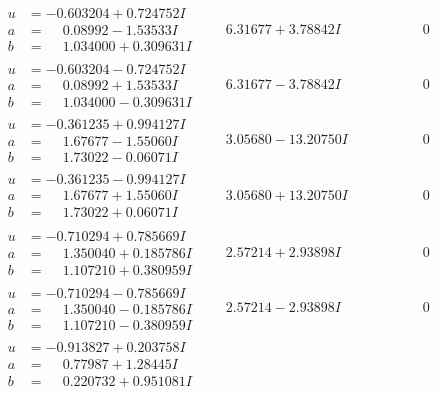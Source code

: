 \documentclass[1p]{elsarticle_modified}
\theoremstyle{definition}
\begin{document}
$$\begin{array}{c|c|c}
\begin{aligned}
u &= -0.603204 + 0.724752 I \\
a &= \phantom{-}0.08992 - 1.53533 I \\
b &= \phantom{-}1.034000 + 0.309631 I\end{aligned}
 & \phantom{-}6.31677 + 3.78842 I & \phantom{-0.000000 } 0 \\ \hline\begin{aligned}
u &= -0.603204 - 0.724752 I \\
a &= \phantom{-}0.08992 + 1.53533 I \\
b &= \phantom{-}1.034000 - 0.309631 I\end{aligned}
 & \phantom{-}6.31677 - 3.78842 I & \phantom{-0.000000 } 0 \\ \hline\begin{aligned}
u &= -0.361235 + 0.994127 I \\
a &= \phantom{-}1.67677 - 1.55060 I \\
b &= \phantom{-}1.73022 - 0.06071 I\end{aligned}
 & \phantom{-}3.05680 - 13.20750 I & \phantom{-0.000000 } 0 \\ \hline\begin{aligned}
u &= -0.361235 - 0.994127 I \\
a &= \phantom{-}1.67677 + 1.55060 I \\
b &= \phantom{-}1.73022 + 0.06071 I\end{aligned}
 & \phantom{-}3.05680 + 13.20750 I & \phantom{-0.000000 } 0 \\ \hline\begin{aligned}
u &= -0.710294 + 0.785669 I \\
a &= \phantom{-}1.350040 + 0.185786 I \\
b &= \phantom{-}1.107210 + 0.380959 I\end{aligned}
 & \phantom{-}2.57214 + 2.93898 I & \phantom{-0.000000 } 0 \\ \hline\begin{aligned}
u &= -0.710294 - 0.785669 I \\
a &= \phantom{-}1.350040 - 0.185786 I \\
b &= \phantom{-}1.107210 - 0.380959 I\end{aligned}
 & \phantom{-}2.57214 - 2.93898 I & \phantom{-0.000000 } 0 \\ \hline\begin{aligned}
u &= -0.913827 + 0.203758 I \\
a &= \phantom{-}0.77987 + 1.28445 I \\
b &= \phantom{-}0.220732 + 0.951081 I\end{aligned}

\end{array}$$
\end{document}
